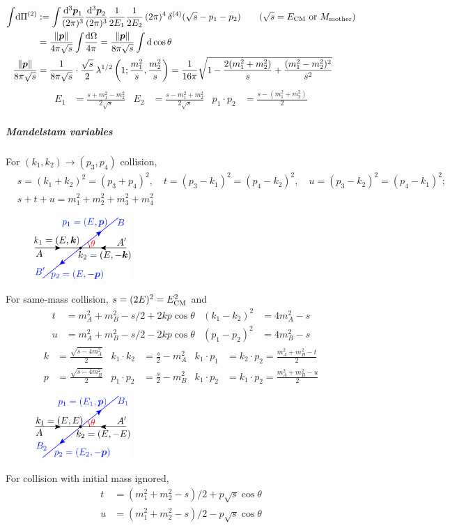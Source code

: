 \documentclass[new]{subfiles}
\begin{document}
\begin{align}
\int\!\dd\Pi^{(2)}
&:=\int\!\frac{\dd^3\vc p_1}{(2\pi)^3}\frac{\dd^3\vc p_2}{(2\pi)^3}
\frac{1}{2E_1}\frac{1}{2E_2}\,(2\pi)^4\ddelta[4](\sqrt{s}-p_1-p_2)\qquad\text{($\sqrt s=E\w{CM}$ or $M\w{mother}$)}
\notag\\&=
\frac{\|\vc p\|}{4\pi\sqrt{s}}\int\!\frac{\dd\Omega}{4\pi}
=
\frac{\|\vc p\|}{8\pi \sqrt{s}}\int\dd\cos\theta
\\
\frac{\|\vc p\|}{8\pi\sqrt{s}}
&=
\frac{1}{8\pi\sqrt{s}}\cdot\frac{\sqrt{s}}{2}\mathop{\lambda^{1/2}}\left(1;\frac{m_1^2}{s},\frac{m_2^2}{s}\right)
=
\frac1{16\pi}\sqrt{1-\frac{2 (m_1^2+m_2^2)}{s}+\frac{(m_1^2-m_2^2)^2}{s^2}}
\end{align}
\begin{align}
 E_1&=\frac{s+m_1^2-m_2^2}{2\sqrt{s}}&
 E_2&=\frac{s-m_1^2+m_2^2}{2\sqrt{s}}&
 p_1\cdot p_2 &= \frac{s-(m_1^2+m_2^2)}{2}
\end{align}

\subparagraph{Mandelstam variables} For $(k_1,k_2)\to(p_3,p_4)$ collision,
\begin{align*}
 &s = (k_1+k_2)^2 = (p_3+p_4)^2, \quad
 t = (p_3-k_1)^2 = (p_4-k_2)^2, \quad
 u = (p_3-k_2)^2 = (p_4-k_1)^2;\\
 & s+t+u=m_1^2+m_2^2+m_3^2+m_4^2
\end{align*}

\begin{figure}
\vspace{-2em}
 \includegraphics[width=10em]{collision.pdf}
\end{figure}
For same-mass collision, $ s = (2E)^2 = E_{\mathrm{CM}}^2$ and
\begin{align*}
 t &= m_A^2+m_B^2 - s/2+2kp\cos\theta
&
(k_1-k_2)^2&=4m_A^2-s
\\
 u &= m_A^2+m_B^2 - s/2-2kp\cos\theta
&
(p_1-p_2)^2&=4m_B^2-s
\end{align*}\vspace{-1.5em}
\begin{align*}
 k&=\frac{\sqrt{s-4m_A^2}}{2}
&k_1\cdot k_2 &= \frac{s}{2}-m_A^2
&k_1\cdot p_1&=k_2\cdot p_2=\frac{m_A^2+m_B^2-t}{2}
\\
 p&=\frac{\sqrt{s-4m_B^2}}{2}
&p_1\cdot p_2 &= \frac{s}{2}-m_B^2
&k_1\cdot p_2&=k_1\cdot p_2=\frac{m_A^2+m_B^2-u}{2}
\end{align*}
\begin{figure}
\vspace{-1.5em}
 \includegraphics[width=10em]{collision2.pdf}
\end{figure}

For collision with initial mass ignored,
\begin{align*}
 t &= (m_1^2+m_2^2-s)/2+p\sqrt{s}\cos\theta\\
 u &= (m_1^2+m_2^2-s)/2-p\sqrt{s}\cos\theta
\end{align*}
\end{document}
